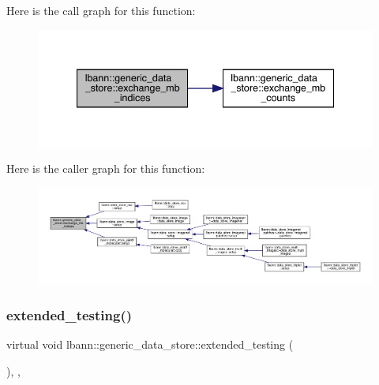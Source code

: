 Here is the call graph for this function\+:\nopagebreak
\begin{figure}[H]
\begin{center}
\leavevmode
\includegraphics[width=340pt]{classlbann_1_1generic__data__store_aa0ef8d7528f6775d47641ffe5ac229da_cgraph}
\end{center}
\end{figure}
Here is the caller graph for this function\+:\nopagebreak
\begin{figure}[H]
\begin{center}
\leavevmode
\includegraphics[width=350pt]{classlbann_1_1generic__data__store_aa0ef8d7528f6775d47641ffe5ac229da_icgraph}
\end{center}
\end{figure}
\mbox{\label{classlbann_1_1generic__data__store_ae569426f71f9317e88fe1078d58c98e7}} 
\subsubsection{\texorpdfstring{extended\+\_\+testing()}{extended\_testing()}}
{\footnotesize\ttfamily virtual void lbann\+::generic\+\_\+data\+\_\+store\+::extended\+\_\+testing (\begin{DoxyParamCaption}{ }\end{DoxyParamCaption})\hspace{0.3cm}{\ttfamily [inline]}, {\ttfamily [protected]}, {\ttfamily [virtual]}}




